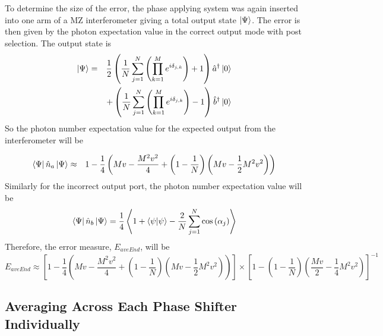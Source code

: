 \documentclass[aps,pra,twocolumn,superscriptaddress,numerical,floatfix]{revtex4-1}
\begin{document}
To determine the size of the error, the phase applying system was again inserted into one arm of a MZ interferometer giving a total output state $\ket{\Psi}$. The error is then given by the photon expectation value in the correct output mode with post selection. The output state is
\begin{eqnarray}
	\ket{\Psi}& = &\frac{1}{2}\left(\frac{1}{N}\sum_{j=1}^{N}\left(\prod_{k=1}^{M}e^{i\delta_{j,k}}\right)+1\right)\hat{a}^{\dagger}\ket{0}\\ & & +\left(\frac{1}{N}\sum_{j=1}^{N}\left(\prod_{k=1}^{M}e^{i\delta_{j,k}}\right)-1\right)\hat{b}^{\dagger}\ket{0}\label{eq:AveEndIntState}
\end{eqnarray}
So the photon number expectation value for the expected output from the interferometer will be
\begin{widetext}
\begin{eqnarray}
	\bra{\Psi}\hat{n}_{a}\ket{\Psi}
& \approx & 1-\frac{1}{4}\left(Mv-\frac{M^{2}v^{2}}{4}+\left(1-\frac{1}{N}\right)\left(Mv-\frac{1}{2}M^{2}v^{2}\right)\right)
\end{eqnarray}
Similarly for the incorrect output port, the photon number expectation value will be
\begin{equation}
	\bra{\Psi}\hat{n}_{b}\ket{\Psi} = \frac{1}{4}\left\langle 1+\left\langle \psi|\psi\right\rangle -\frac{2}{N}\sum_{j=1}^{N}\cos\left(\alpha_{j}\right)\right\rangle 
\end{equation}
Therefore, the error measure, $E_{aveEnd}$, will be
\begin{equation}
E_{aveEnd}  \approx  \left[1-\frac{1}{4}\left(Mv-\frac{M^{2}v^{2}}{4}+\left(1-\frac{1}{N}\right)\left(Mv-\frac{1}{2}M^{2}v^{2}\right)\right)\right]\nonumber\times\left[1-\left(1-\frac{1}{N}\right)\left(\frac{Mv}{2}-\frac{1}{4}M^{2}v^{2}\right)\right]^{-1}\label{eq:ErrorAvEnd}
\end{equation}
\end{widetext}

\subsection{Averaging Across Each Phase Shifter Individually\label{Averaging Across Each Phase Shifter Individually}}
\end{document}
